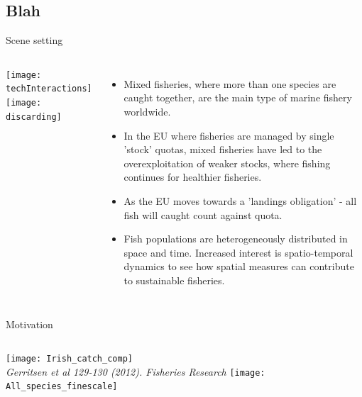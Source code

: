 \documentclass[xcolor=x11names,compress]{beamer}
\renewcommand{\(}{\begin{columns}}
\renewcommand{\)}{\end{columns}}
\newcommand{\<}[1]{\begin{column}{#1}}
\renewcommand{\>}{\end{column}}
\begin{document}
\subsection{Blah}
\begin{frame}{Scene setting}

\begin{columns}
	
	
\column{0.3\paperwidth}
\vspace{-1.5cm}
\texttt{[image: techInteractions]}\\ 
\texttt{[image: discarding]} 

\column{0.7\paperwidth}

\begin{itemize}
	\small	
	\setlength\itemsep{1em}
	\pause
	\item Mixed fisheries, where more than one species are caught together,
		are the main type of marine fishery worldwide. \pause
	\item In the EU where fisheries are managed by single 'stock' quotas,
		mixed fisheries have led to the overexploitation of weaker
		stocks, where fishing continues for healthier fisheries. \pause
	\item As the EU moves towards a 'landings obligation' - all fish will
		caught count against quota. \pause
	\item Fish populations are heterogeneously distributed in space and
		time. Increased interest is spatio-temporal dynamics to see how
		spatial measures can contribute to sustainable fisheries. 
\end{itemize}
	
\end{columns}

\end{frame}

\begin{frame}{Motivation}

\begin{columns}
\column{0.4\paperwidth}
\texttt{[image: Irish\_catch\_comp]}
\\
\tiny
\hspace{0.2cm}
\textit{Gerritsen et al 129-130 (2012). Fisheries Research} 
\column{0.6\paperwidth}
\texttt{[image: All\_species\_finescale]}

\end{columns}
\end{frame}
\end{document}
